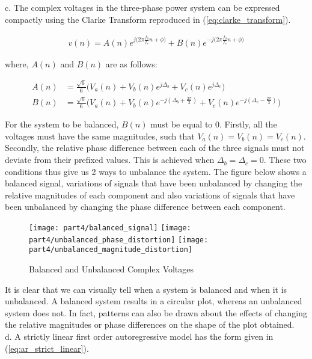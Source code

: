 \noindent{}c. The complex voltages in  the three-phase power system can be expressed compactly using the Clarke Transform reproduced in (\ref{eq:clarke_transform}).

\begin{align}
v(n) = A(n)e^{j\big(2\pi\frac{f_0}{f_s}n+\phi\big)} + B(n)e^{-j\big(2\pi\frac{f_0}{f_s}n+\phi\big)} \label{eq:clarke_transform}
\end{align}

\noindent{}where, $A(n)$ and $B(n)$ are as follows:

\begin{align*}
A(n) &= \frac{\sqrt{6}}{6}\bigg(V_a(n)+V_b(n)e^{j\Delta_b}+V_c(n)e^{j\Delta_c}\bigg) \\
B(n) &= \frac{\sqrt{6}}{6}\bigg(V_a(n)+V_b(n)e^{-j(\Delta_b + \frac{2\pi}{3})}+V_c(n)e^{-j(\Delta_c-\frac{2\pi}{3})}\bigg)
\end{align*}

\noindent{}For the system to be balanced, $B(n)$ must be equal to 0. Firstly, all the voltages must have the same magnitudes, such that $V_a(n)=V_b(n)=V_c(n)$. Secondly, the relative phase difference between each of the three signals must not deviate from their prefixed values. This is achieved when $\Delta_b=\Delta_c=0$. These two conditions thus give us 2 ways to unbalance the system. The figure below shows a balanced signal, variations of signals that have been unbalanced by changing the relative magnitudes of each component and also variations of signals that have been unbalanced by changing the phase difference between each component.  
\begin{figure}[H]
\centering{}
\texttt{[image: part4/balanced\_signal]}
\texttt{[image: part4/unbalanced\_phase\_distortion]}
\texttt{[image: part4/unbalanced\_magnitude\_distortion]}
\caption{Balanced and Unbalanced Complex Voltages}
\end{figure}

\noindent{}It is clear that we can visually tell when a system is balanced and when it is unbalanced. A balanced system results in a circular plot, whereas an unbalanced system does not. In fact, patterns can also be drawn about the effects of changing the relative magnitudes or phase differences on the shape of the plot obtained.\\

\noindent{}d. A strictly linear first order autoregressive model has the form given in (\ref{eq:ar_strict_linear}). 

